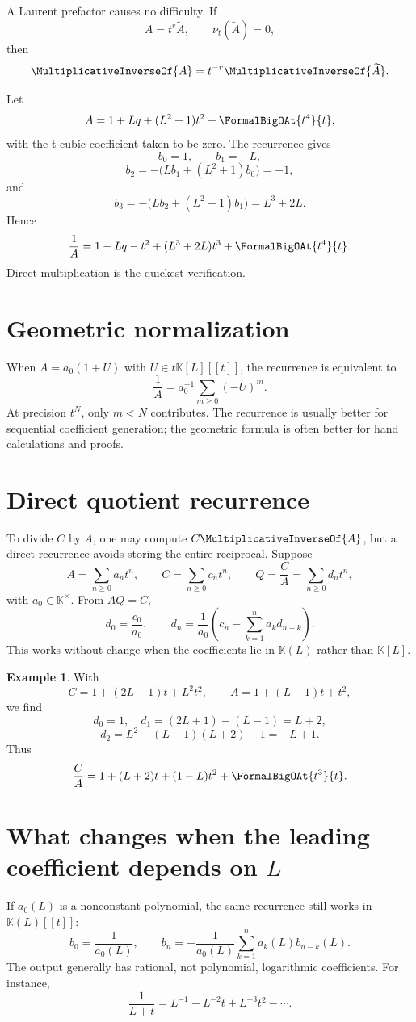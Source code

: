 \documentclass[11pt,openany]{book}
\theoremstyle{definition}
\newtheorem{example}{Example}[chapter]
\theoremstyle{plain}
\theoremstyle{remark}
\newcommand{\K}{\mathbb{K}}
\newcommand{\val}{\nu}
\newcommand{\recip}[1]{\MultiplicativeInverseOf{#1}}
\begin{document}
A Laurent prefactor causes no difficulty.  If
\[
 A=t^r\widetilde A,
 \qquad \val_t(\widetilde A)=0,
\]
then
\[
 \recip{A}=t^{-r}\recip{\widetilde A}.
\]

\begin{workedbox}
Let
\[
 A=1+Lq+(L^2+1)t^2+\FormalBigOAt{t^4}{t},
\]
with the t-cubic coefficient taken to be zero.  The recurrence gives
\[
 b_0=1,
 \qquad b_1=-L,
\]
\[
 b_2=-\bigl(Lb_1+(L^2+1)b_0\bigr)=-1,
\]
and
\[
 b_3=-\bigl(Lb_2+(L^2+1)b_1\bigr)=L^3+2L.
\]
Hence
\[
 \frac1A=1-Lq-t^2+(L^3+2L)t^3+\FormalBigOAt{t^4}{t}.
\]
Direct multiplication is the quickest verification.
\end{workedbox}

\section{Geometric normalization}
When \(A=a_0(1+U)\) with \(U\in t\K[L][[t]]\), the recurrence is equivalent to
\begin{equation}\label{eq:geometric-recip}
 \frac1A=a_0^{-1}\sum_{m\ge0}(-U)^m.
\end{equation}
At precision \(t^N\), only \(m<N\) contributes.  The recurrence is usually
better for sequential coefficient generation; the geometric formula is often
better for hand calculations and proofs.

\section{Direct quotient recurrence}
To divide \(C\) by \(A\), one may compute \(C\recip{A}\), but a direct
recurrence avoids storing the entire reciprocal.  Suppose
\[
 A=\sum_{n\ge0}a_nt^n,
 \qquad
 C=\sum_{n\ge0}c_nt^n,
 \qquad
 Q=\frac CA=\sum_{n\ge0}d_nt^n,
\]
with \(a_0\in\K^\times\).  From \(AQ=C\),
\begin{equation}\label{eq:quotient-recurrence}
 d_0=\frac{c_0}{a_0},
 \qquad
 d_n=\frac1{a_0}
 \left(c_n-\sum_{k=1}^n a_kd_{n-k}\right).
\end{equation}
This works without change when the coefficients lie in \(\K(L)\) rather than
\(\K[L]\).

\begin{example}
With
\[
 C=1+(2L+1)t+L^2t^2,
 \qquad
 A=1+(L-1)t+t^2,
\]
we find
\[
 d_0=1,
 \quad
 d_1=(2L+1)-(L-1)=L+2,
\]
\[
 d_2=L^2-(L-1)(L+2)-1=-L+1.
\]
Thus
\[
 \frac CA=1+(L+2)t+(1-L)t^2+\FormalBigOAt{t^3}{t}.
\]
\end{example}

\section{What changes when the leading coefficient depends on \texorpdfstring{\(L\)}{L}}
If \(a_0(L)\) is a nonconstant polynomial, the same recurrence still works in
\(\K(L)[[t]]\):
\[
 b_0=\frac1{a_0(L)},
 \qquad
 b_n=-\frac1{a_0(L)}\sum_{k=1}^na_k(L)b_{n-k}(L).
\]
The output generally has rational, not polynomial, logarithmic coefficients.
For instance,
\[
 \frac1{L+t}=L^{-1}-L^{-2}t+L^{-3}t^2-\cdots.
\]
\end{document}
